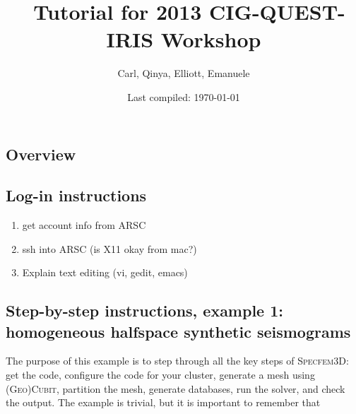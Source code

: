 \documentclass[10pt,fleqn,letterpaper]{article}
\title{\specfem\ Tutorial for 2013 CIG-QUEST-IRIS Workshop}
\author{Carl, Qinya, Elliott, Emanuele}
\date{Last compiled: \today}
\newcommand{\specfem}{\textsc{Specfem3D}}
\newcommand{\cubit}{\textsc{Cubit}}
\begin{document}

\maketitle



\subsection*{Overview}


\subsection*{Log-in instructions}

\begin{enumerate}
\item get account info from ARSC
\item ssh into ARSC (is X11 okay from mac?)
\item Explain text editing (vi, gedit, emacs)
\end{enumerate}


\subsection*{Step-by-step instructions, example 1: homogeneous halfspace synthetic seismograms}

The purpose of this example is to step through all the key steps of \specfem: get the code, configure the code for your cluster, generate a mesh using (\textsc{Geo})\cubit, partition the mesh, generate databases, run the solver, and check the output. The example is trivial, but it is important to remember that 
\end{document}
